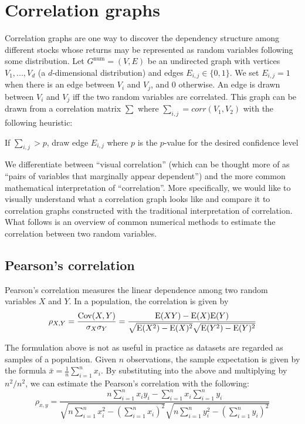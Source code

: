 \section{Correlation graphs}
\label{sec:intro:correlation}

Correlation graphs are one way to discover the dependency structure among
different stocks whose returns may be represented as random variables following
some distribution. Let $G^{\text{num}}=(V,E)$ be an undirected graph with 
vertices
$V_{1},...,V_{d}$ (a $d$-dimensional distribution) and edges
$E_{i,j}\in\{0,1\}$. We set $E_{i,j}=1$ when there is an edge between $V_i$ and
$V_j$, and 0 otherwise. An edge is drawn between $V_i$ and $V_j$ iff the two
random variables are correlated. This graph can be drawn from a correlation
matrix $\sum$ where $\sum_{i,j}=corr(V_1,V_2)$ with the following heuristic:\\

\begin{algorithm}
	If $\sum_{i,j}>p$, draw edge $E_{i,j}$ where $p$ is the $p$-value for the
	desired confidence level
\end{algorithm}

We differentiate between ``visual correlation'' (which can be thought more of as
``pairs of variables that marginally appear dependent'') and the more common
mathematical interpretation of ``correlation''. More specifically, we would like
to visually understand what a correlation graph looks like and compare it to
correlation graphs constructed with the traditional interpretation of
correlation. What follows is an overview of common numerical methods to estimate
the correlation between two random variables.

\subsection{Pearson's correlation}

Pearson's correlation measures the linear dependence among two random variables
$X$ and $Y$. In a population, the correlation is given by
$$\rho_{X,Y}=\frac{\mathrm{Cov}(X,Y)}{\sigma_X \sigma_Y} =
\frac{\mathrm{E}(XY)-\mathrm{E}(X)\mathrm{E}(Y)}{\sqrt{\mathrm{E}(X^2)-\mathrm{E}(X)^2} \sqrt{\mathrm{E}(Y^2)-\mathrm{E}(Y)^2}}$$ 

The formulation above is not as useful in practice as datasets are regarded as
samples of a population. Given $n$ observations, the sample expectation is given
by the formula  $\bar{x}=\frac{1}{n}\sum\limits_{i=1}^{n}x_i$. By substituting
into the above and multiplying by $n^2/n^2$, we can estimate the Pearson's
correlation with the following:
$$\rho_{x,y}=
\frac{n \sum\limits_{i=1}^{n} x_i y_i - \sum\limits_{i=1}^{n} x_i
	\sum\limits_{i=1}^{n} y_i}
{\sqrt{n\sum\limits_{i=1}^{n} x_i^2-\left(\sum\limits_{i=1}^{n} x_i\right)^2} 
	\sqrt{n\sum\limits_{i=1}^{n} y_i^2-\left(\sum\limits_{i=1}^{n} y_i\right)^2}}$$ 

